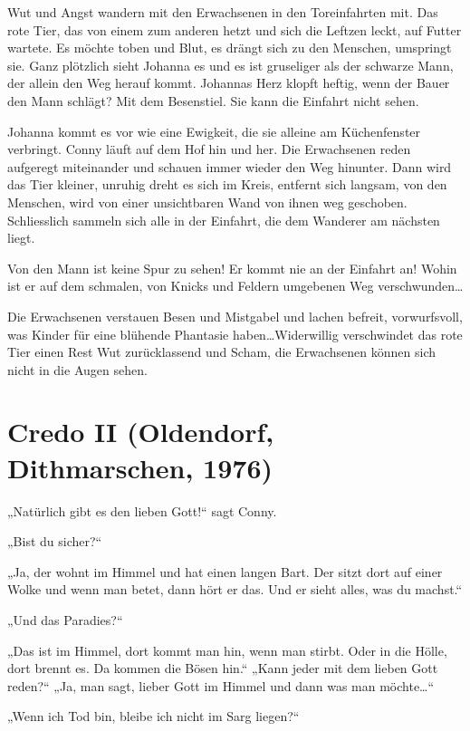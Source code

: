 \documentclass[10pt,a5paper]{book}
\begin{document}
Wut und Angst wandern mit den Erwachsenen in den Toreinfahrten mit. Das rote Tier, das von einem zum anderen hetzt und sich die Leftzen leckt, auf Futter wartete. Es möchte toben und Blut, es drängt sich zu den Menschen, umspringt sie. Ganz plötzlich sieht Johanna es und es ist gruseliger als der schwarze Mann, der allein den Weg herauf kommt. Johannas Herz klopft heftig, wenn der Bauer den Mann schlägt? Mit dem Besenstiel. Sie kann die Einfahrt nicht sehen. 

Johanna kommt es vor wie eine Ewigkeit, die sie alleine am Küchenfenster verbringt. Conny läuft auf dem Hof hin und her. Die Erwachsenen reden aufgeregt miteinander und schauen immer wieder den Weg hinunter. Dann wird das  Tier kleiner, unruhig dreht es sich im Kreis, entfernt sich langsam, von den Menschen, wird von einer unsichtbaren Wand von ihnen weg geschoben.
Schliesslich sammeln sich alle in der Einfahrt, die dem Wanderer am nächsten liegt.  

Von den Mann ist keine Spur zu sehen! Er kommt nie an der Einfahrt an!
Wohin ist er auf dem schmalen, von Knicks und Feldern umgebenen Weg verschwunden\dots

Die Erwachsenen verstauen Besen und Mistgabel und lachen befreit, vorwurfsvoll, was Kinder für eine blühende Phantasie haben\dots Widerwillig verschwindet das rote Tier einen Rest Wut zurücklassend und Scham, die Erwachsenen können sich nicht in die Augen sehen.



\section*{Credo II (Oldendorf, Dithmarschen, 1976)}



„Natürlich gibt es den lieben Gott!“ sagt Conny. 

„Bist du sicher?“

„Ja, der wohnt im Himmel und hat einen langen Bart. Der sitzt dort auf einer Wolke und wenn man betet, dann hört er das. Und er sieht alles, was du machst.“

„Und das Paradies?“  

„Das ist im Himmel, dort kommt man hin, wenn man stirbt. Oder in die Hölle, dort brennt es. Da kommen die Bösen hin.“ 
„Kann jeder mit dem lieben Gott reden?“ „Ja, man sagt, lieber Gott im Himmel und dann was man möchte\dots“


„Wenn ich Tod bin, bleibe ich nicht im Sarg liegen?“
\end{document}
